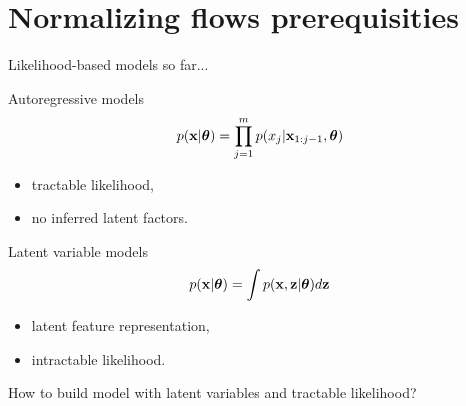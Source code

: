 \section{Normalizing flows prerequisities}
\begin{frame}{Likelihood-based models so far...}
	\begin{minipage}[t]{0.5\columnwidth}
		\begin{block}{Autoregressive models}
			\vspace{-0.5cm}
			\[
				p(\mathbf{x}|\boldsymbol{\theta}) = \prod_{j=1}^m p(x_j | \mathbf{x}_{1:j - 1}, \boldsymbol{\theta})
			\]
			\vspace{-0.2cm}
			\begin{itemize}
				\item tractable likelihood, 
				\item no inferred latent factors.
			\end{itemize}
		\end{block}
	\end{minipage}%
	\begin{minipage}[t]{0.5\columnwidth}
		\begin{block}{Latent variable models}
			\[
				p(\mathbf{x}| \boldsymbol{\theta}) = \int p(\mathbf{x}, \mathbf{z} | \boldsymbol{\theta}) d \mathbf{z}
			\]
			\begin{itemize}
				\item latent feature representation, 
				\item intractable likelihood.
			\end{itemize}
		\end{block}
	\end{minipage}
	
	\vspace{1cm } 
	How to build model with latent variables and tractable likelihood?
\end{frame}
